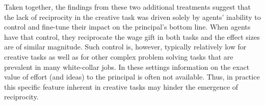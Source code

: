 






Taken together, the findings from these two additional treatments suggest 
that the lack of reciprocity in the creative task was driven solely by agents' inability to control and fine-tune their impact on the principal's bottom line. When agents have that control,  they reciprocate the wage gift in both tasks and the effect sizes are of similar magnitude. Such control is, however, typically relatively low 
for creative tasks as well as for other complex problem solving tasks 
that are prevalent in many white-collar jobs. In these settings
 information on the exact value of effort (and ideas) to the principal is often 
not available. Thus, in practice this specific feature inherent in creative tasks may hinder 
the emergence of reciprocity.



